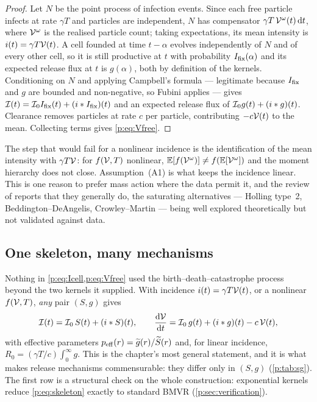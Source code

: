 \begin{proof}
Let $N$ be the point process of infection events. Since each free particle
infects at rate $\gamma T$ and particles are independent, $N$ has
compensator $\gamma T\,\mathcal{V}^{\omega}(t)\,\mathrm{d} t$, where $\mathcal{V}^\omega$ is
the realised particle count; taking expectations, its mean intensity is
$i(t)=\gamma T\mathcal{V}(t)$. A cell founded at time $t-\alpha$ evolves
independently of $N$ and of every other cell, so it is still productive at
$t$ with probability $I_{\mathrm{fix}}(\alpha)$ and its expected release flux at $t$ is
$g(\alpha)$, both by definition of the kernels. Conditioning on $N$ and
applying Campbell's formula --- legitimate because $I_{\mathrm{fix}}$ and $g$ are
bounded and non-negative, so Fubini applies --- gives
$\mathcal{I}(t)=\mathcal{I}_0I_{\mathrm{fix}}(t)+(i*I_{\mathrm{fix}})(t)$ and an expected release flux of
$\mathcal{I}_0g(t)+(i*g)(t)$. Clearance removes particles at rate $c$ per
particle, contributing $-c\mathcal{V}(t)$ to the mean. Collecting terms gives
\cref{p:eq:Vfree}.
\end{proof}

\noindent
The step that would fail for a nonlinear incidence is the identification of
the mean intensity with $\gamma T\mathcal{V}$: for $f(\mathcal{V},T)$ nonlinear,
$\mathbb{E}\!\left[f(\mathcal{V}^\omega)\right]\neq f(\mathbb{E}\!\left[\mathcal{V}^\omega\right])$ and the moment
hierarchy does not close. Assumption~(A1) is what keeps the incidence
linear. This is one reason to prefer mass action where the data permit it,
and the review of \cite{ciupe2024incorporating} reports that they generally
do, the saturating alternatives --- Holling type~2, Beddington--DeAngelis,
Crowley--Martin --- being well explored theoretically but not validated
against data.

\subsection{One skeleton, many mechanisms}
\label{p:sec:generality}

Nothing in \cref{p:eq:Icell,p:eq:Vfree} used the birth--death--catastrophe
process beyond the two kernels it supplied. With incidence
$i(t)=\gamma T\mathcal{V}(t)$, or a nonlinear $f(\mathcal{V},T)$, \emph{any} pair
$(S,g)$ gives
\begin{equation}
\mathcal{I}(t)=\mathcal{I}_0\,S(t)+(i*S)(t),
\qquad
\frac{\mathrm{d} \mathcal{V}}{\mathrm{d} t}=\mathcal{I}_0\,g(t)+(i*g)(t)-c\,\mathcal{V}(t),
\label{p:eq:skeleton}
\end{equation}
with effective parameters $p_{\rm eff}(r)=\widetilde{g}(r)/\widetilde{S}(r)$ and, for
linear incidence, $R_0=(\gamma T/c)\int_0^\infty g$. This is the chapter's
most general statement, and it is what makes release mechanisms
commensurable: they differ only in $(S,g)$ (\cref{p:tab:sg}). The first row
is a structural check on the whole construction: exponential kernels reduce
\cref{p:eq:skeleton} exactly to standard BMVR
(\cref{p:sec:verification}).

